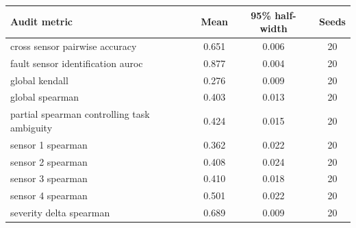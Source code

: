 \begin{tabular}{lccc}
\toprule
Audit metric & Mean & 95\% half-width & Seeds \\
\midrule
cross sensor pairwise accuracy & 0.651 & 0.006 & 20 \\
fault sensor identification auroc & 0.877 & 0.004 & 20 \\
global kendall & 0.276 & 0.009 & 20 \\
global spearman & 0.403 & 0.013 & 20 \\
partial spearman controlling task ambiguity & 0.424 & 0.015 & 20 \\
sensor 1 spearman & 0.362 & 0.022 & 20 \\
sensor 2 spearman & 0.408 & 0.024 & 20 \\
sensor 3 spearman & 0.410 & 0.018 & 20 \\
sensor 4 spearman & 0.501 & 0.022 & 20 \\
severity delta spearman & 0.689 & 0.009 & 20 \\
\bottomrule
\end{tabular}
